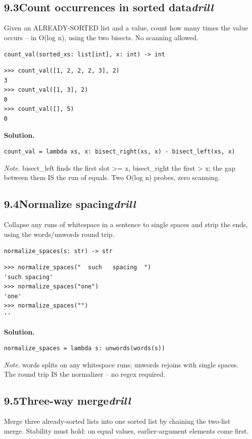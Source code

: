 \documentclass[10pt,letterpaper]{book}
\begin{document}
\subsection*{9.3\quad Count occurrences in sorted data\hfill\textnormal{\textit{drill}}}
Given an ALREADY-SORTED list and a value, count how many times the value occurs -- in O(log n), using the two bisects. No scanning allowed.

\noindent\texttt{count\_val(sorted\_xs: list[int], x: int) -> int}
\begin{lstlisting}[style=ex]
>>> count_val([1, 2, 2, 2, 3], 2)
3
>>> count_val([1, 3], 2)
0
>>> count_val([], 5)
0
\end{lstlisting}
\noindent\textbf{Solution.}
\begin{lstlisting}[style=code]
count_val = lambda xs, x: bisect_right(xs, x) - bisect_left(xs, x)
\end{lstlisting}
\noindent\textit{Note.} bisect\_left finds the first slot >= x, bisect\_right the first > x; the gap between them IS the run of equals. Two O(log n) probes, zero scanning.

\subsection*{9.4\quad Normalize spacing\hfill\textnormal{\textit{drill}}}
Collapse any runs of whitespace in a sentence to single spaces and strip the ends, using the words/unwords round trip.

\noindent\texttt{normalize\_spaces(s: str) -> str}
\begin{lstlisting}[style=ex]
>>> normalize_spaces("  such   spacing  ")
'such spacing'
>>> normalize_spaces("one")
'one'
>>> normalize_spaces("")
''
\end{lstlisting}
\noindent\textbf{Solution.}
\begin{lstlisting}[style=code]
normalize_spaces = lambda s: unwords(words(s))
\end{lstlisting}
\noindent\textit{Note.} words splits on any whitespace runs; unwords rejoins with single spaces. The round trip IS the normalizer -- no regex required.

\subsection*{9.5\quad Three-way merge\hfill\textnormal{\textit{drill}}}
Merge three already-sorted lists into one sorted list by chaining the two-list merge. Stability must hold: on equal values, earlier-argument elements come first.
\end{document}
